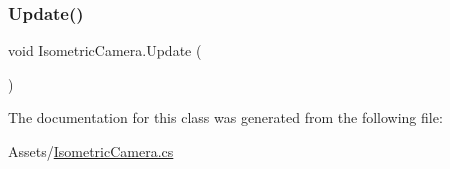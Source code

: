 \subsubsection{\texorpdfstring{Update()}{Update()}}
{\footnotesize\ttfamily void Isometric\+Camera.\+Update (\begin{DoxyParamCaption}{ }\end{DoxyParamCaption})\hspace{0.3cm}{\ttfamily [private]}}



The documentation for this class was generated from the following file\+:\begin{DoxyCompactItemize}
\item 
Assets/\hyperlink{_isometric_camera_8cs}{Isometric\+Camera.\+cs}\end{DoxyCompactItemize}
